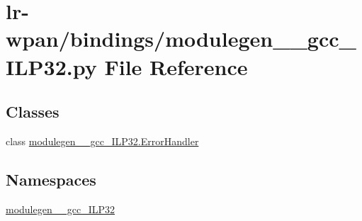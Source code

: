 \hypertarget{lr-wpan_2bindings_2modulegen____gcc__ILP32_8py}{}\section{lr-\/wpan/bindings/modulegen\+\_\+\+\_\+gcc\+\_\+\+I\+L\+P32.py File Reference}
\label{lr-wpan_2bindings_2modulegen____gcc__ILP32_8py}
\subsection*{Classes}
\begin{DoxyCompactItemize}
\item 
class \hyperlink{classmodulegen____gcc__ILP32_1_1ErrorHandler}{modulegen\+\_\+\+\_\+gcc\+\_\+\+I\+L\+P32.\+Error\+Handler}
\end{DoxyCompactItemize}
\subsection*{Namespaces}
\begin{DoxyCompactItemize}
\item 
 \hyperlink{namespacemodulegen____gcc__ILP32}{modulegen\+\_\+\+\_\+gcc\+\_\+\+I\+L\+P32}
\end{DoxyCompactItemize}
